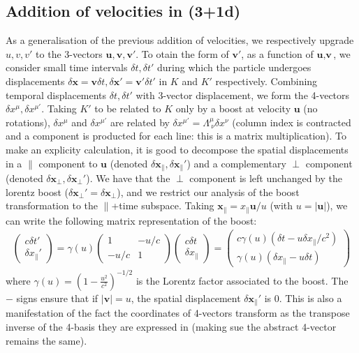 \documentclass[10pt, a4paper]{article}
\begin{document}
{\subsection{Addition of velocities in (3+1d)}
As a generalisation of the previous addition of velocities, we respectively upgrade $u, v, v'$ to the 3-vectors $\textbf{u}, \textbf{v}, \textbf{v}'$. To otain the form of $\textbf{v}'$, as a function of $\textbf{u}, \textbf{v}$, we consider small time intervals $\delta t, \delta t'$  during which the particle undergoes displacements $\delta \textbf{x} = \textbf{v} \delta t, \delta \textbf{x}' = \textbf{v}' \delta t'$ in $K$ and $K'$ respectively. Combining temporal displacements $\delta t, \delta t'$ with 3-vector displacement, we form the 4-vectors $\delta x^{\mu}, \delta x^{\mu'}$. Taking $K'$ to be related to $K$ only by a boost at velocity $\textbf{u}$ (no rotations), $\delta x^{\mu}$ and $\delta x^{\mu'}$ are related by $\delta x^{\mu'} = \Lambda_{\ \nu}^{\mu} \delta x^{\nu}$ (column index is contracted and a component is producted for each line: this is a matrix multiplication). To make an explicity calculation, it is good to decompose the spatial displacements in a $\parallel$ component to $\mathbf{u}$ (denoted $\delta  \textbf{x}_{\parallel}, \delta  \textbf{x}_{\parallel}'$) and a complementary $\perp$ component (denoted $\delta  \textbf{x}_{\perp}, \delta  \textbf{x}_{\perp}'$). We have that the $\perp$ component is left unchanged by the lorentz boost ($\delta \textbf{x}_{\perp}' = \delta \textbf{x}_{\perp}$), and we restrict our analysis of the boost transformation to the $\parallel$+time subspace. Taking $\textbf{x}_{\parallel} = x_{\parallel} \textbf{u}/u$ (with $u = |\textbf{u}|$), we can write the following matrix representation of the boost: 
\begin{align*}
    \begin{pmatrix}
        c\delta t'\\
        \delta x_\parallel'
    \end{pmatrix}
    =\gamma(u)
    \begin{pmatrix}
        1  & -u/c\\
        -u/c & 1 
    \end{pmatrix}
    \begin{pmatrix}
        c\delta t\\
        \delta x_\parallel
    \end{pmatrix}
    = \begin{pmatrix}
        c\gamma(u) (\delta t - u \delta x_\parallel/c^2)\\
        \gamma(u) (\delta x_\parallel - u \delta t)
    \end{pmatrix}
\end{align*}
where $\gamma(u) = (1-\frac{u^2}{c^2})^{-1/2}$ is the Lorentz factor associated to the boost. The $-$ signs ensure that if $|\mathbf{v}| = u$, the spatial displacement $\delta \mathbf{x}_\parallel'$ is $0$. This is also a manifestation of the fact the coordinates of 4-vectors transform as the transpose inverse of the 4-basis they are expressed in (making sue the abstract 4-vector remains the same). 

}
\end{document}
